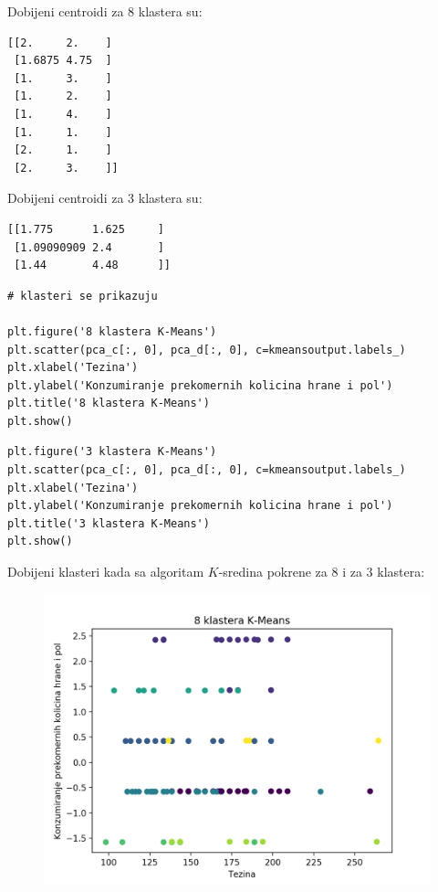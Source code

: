 \documentclass[12pt,a4paper]{article}
\begin{document}
Dobijeni centroidi za 8 klastera su:

\begin{verbatim}
[[2.     2.    ]
 [1.6875 4.75  ]
 [1.     3.    ]
 [1.     2.    ]
 [1.     4.    ]
 [1.     1.    ]
 [2.     1.    ]
 [2.     3.    ]]
\end{verbatim}

Dobijeni centroidi za 3 klastera su:

\begin{verbatim}
[[1.775      1.625     ]
 [1.09090909 2.4       ]
 [1.44       4.48      ]]
\end{verbatim}

\begin{lstlisting}[mathescape=true]
# klasteri se prikazuju

plt.figure('8 klastera K-Means')
plt.scatter(pca_c[:, 0], pca_d[:, 0], c=kmeansoutput.labels_)
plt.xlabel('Tezina')
plt.ylabel('Konzumiranje prekomernih kolicina hrane i pol')
plt.title('8 klastera K-Means')
plt.show()
\end{lstlisting}

\begin{lstlisting}[mathescape=true]
plt.figure('3 klastera K-Means')
plt.scatter(pca_c[:, 0], pca_d[:, 0], c=kmeansoutput.labels_)
plt.xlabel('Tezina')
plt.ylabel('Konzumiranje prekomernih kolicina hrane i pol')
plt.title('3 klastera K-Means')
plt.show()
\end{lstlisting}

Dobijeni klasteri kada sa algoritam $K$-sredina pokrene za 8 i za 3 klastera: 

\begin{figure}[H]
  \centering
  \includegraphics[width=15cm]{k-means.png}
\end{figure}
\end{document}
